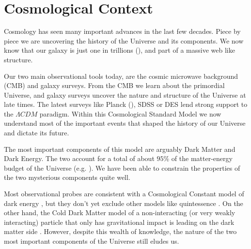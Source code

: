 
\section{Cosmological Context}

Cosmology has seen many important advances in the last few decades. Piece by piece we are uncovering the history of the Universe and its components. We now know that our galaxy is just one in trillions (\cite{2016ApJ...830...83C}), and part of a massive web like structure.

Our two main observational tools today, are the cosmic microwave background (CMB) and galaxy surveys. From the CMB we learn about the primordial Universe, and galaxy surveys uncover the nature and structure of the Universe at late times. The latest surveys like Planck (\cite{2016A&A...594A..13P}), SDSS  or DES  lend strong support to the $\Lambda CDM$ paradigm. Within this Cosmological Standard Model we now understand most of the important events that shaped the history of our Universe and dictate its future. 

The most important components of this model are arguably Dark Matter and Dark Energy. The two account for a total of about $95\%$ of the matter-energy budget of the Universe (e.g. \cite{2016A&A...594A..13P}). We have been able to constrain the properties of the two mysterious components quite well.


Most observational probes are consistent with a Cosmological Constant model of dark energy , but they don't yet exclude other models like quintessence . On the other hand, the Cold Dark Matter model of a non-interacting (or very weakly interacting) particle that only has gravitational impact is leading on the dark matter side . However, despite this wealth of knowledge, the nature of the two most important components of the Universe still eludes us.



